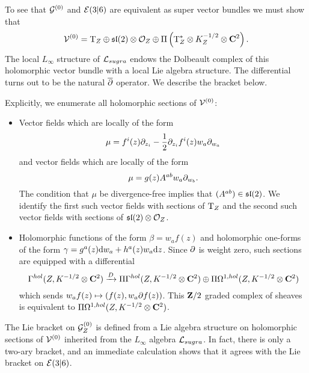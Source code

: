 To see that $\mathcal G^{(0)}$ and $\mathcal E(3|6)$ are equivalent as super vector bundles we must show that
\[
\mathcal V^{(0)} = {\rm T}_Z \oplus \mathfrak{sl}(2) \otimes \mathcal O_Z \oplus \Pi \left( {\rm T}^*_Z \otimes K^{-1/2}_Z \otimes \mathbf{C}^2 \right).
\]
The local $L_\infty$ structure of $\mathcal L_{sugra}$ endows the Dolbeault complex of this holomorphic vector bundle with a local Lie algebra structure.
The differential turns out to be the natural $\overline{\partial}$ operator.
We describe the bracket below.

Explicitly, we enumerate all holomorphic sections of $\mathcal V^{(0)}$:
\begin{itemize}
\item Vector fields which are locally of the form 
\[
\mu = f^i(z) \partial_{z_i} - \frac12 \partial_{z_i} f^i(z) w_a \partial_{w_a}
\]
and vector fields which are locally of the form
\[
\mu = g(z) A^{ab} w_a \partial_{w_b}.
\]
The condition that $\mu$ be divergence-free implies that $(A^{ab}) \in \mathfrak{sl}(2)$.
We identify the first such vector fields with sections of ${\rm T}_Z$ and the second such vector fields with sections of $\mathfrak{sl}(2) \otimes \mathcal O_Z$. 
\item Holomorphic functions of the form $\beta = w_a f(z)$ and holomorphic one-forms of the form $\gamma = g^{a}(z) {\rm d} w_a + h^{a} (z) w_a {\rm d} z$. 
Since $\partial$ is weight zero, such sections are equipped with a differential 
\[
\Gamma^{hol}(Z, K^{-1/2}\otimes \mathbf{C}^2) \xrightarrow{D} \Pi \Gamma^{hol}(Z, K^{-1/2} \otimes \mathbf{C}^2) \oplus \Pi\Omega^{1,hol}(Z, K^{-1/2}\otimes \mathbf{C}^2) 
\]
which sends $w_a f(z) \mapsto (f(z) , w_a \partial f (z))$. 
This $\mathbf{Z}/2$ graded complex of sheaves is equivalent to $\Pi\Omega^{1,hol}(Z, K^{-1/2}\otimes \mathbf{C}^2)$. 
\end{itemize}

The Lie bracket on $\mathcal G_Z^{(0)}$ is defined from a Lie algebra structure on holomorphic sections of $\mathcal V^{(0)}$ inherited from the $L_\infty$ algebra $\mathcal L_{sugra}$. 
In fact, there is only a two-ary bracket, and an immediate calculation shows that it agrees with the Lie bracket on $\mathcal E(3|6)$. 


